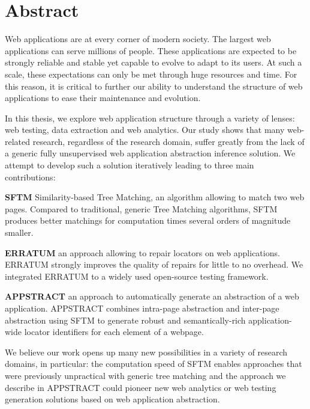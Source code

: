 \thispagestyle{empty}
\section*{Abstract}

\begin{doublespace}
Web applications are at every corner of modern society.
The largest web applications can serve millions of people.
These applications are expected to be strongly reliable and stable yet capable to evolve to adapt to its users.
At such a scale, these expectations can only be met through huge resources and time. 
For this reason, it is critical to further our ability to understand the structure of web applications to ease their maintenance and evolution.

In this thesis, we explore web application structure through a variety of lenses: web testing, data extraction and web analytics.
Our study shows that many web-related research, regardless of the research domain, suffer greatly from the lack of a generic fully unsupervised web application abstraction inference solution. We attempt to develop such a solution iteratively leading to three main contributions:

\textbf{SFTM} Similarity-based Tree Matching, an algorithm allowing to match two web pages. Compared to traditional, generic Tree Matching algorithms, SFTM produces better matchings for computation times several orders of magnitude smaller.

\textbf{ERRATUM} an approach allowing to repair locators on web applications. ERRATUM strongly improves the quality of repairs for little to no overhead. We integrated ERRATUM to a widely used open-source testing framework.

\textbf{APPSTRACT} an approach to automatically generate an abstraction of a web application. APPSTRACT combines intra-page abstraction and inter-page abstraction using SFTM to generate robust and semantically-rich application-wide locator identifiers for each element of a webpage.

We believe our work opens up many new possibilities in a variety of research domains, in particular: the computation speed of SFTM enables approaches that were previously unpractical with generic tree matching and the approach we describe in APPSTRACT could pioneer new web analytics or web testing generation solutions based on web application abstraction.
\end{doublespace}

